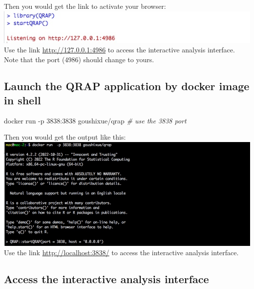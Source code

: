 \documentclass[
  a4paper,
  oneside]{book}
\newenvironment{Shaded}{\begin{snugshade}}{\end{snugshade}}
\newcommand{\CommentTok}[1]{\textcolor[rgb]{0.56,0.35,0.01}{\textit{#1}}}
\newcommand{\DecValTok}[1]{\textcolor[rgb]{0.00,0.00,0.81}{#1}}
\newcommand{\NormalTok}[1]{#1}
\newcommand{\SpecialCharTok}[1]{\textcolor[rgb]{0.00,0.00,0.00}{#1}}
\begin{document}
Then you would get the link to activate your browser:\\
\includegraphics{images/launch_R.jpeg}\\
Use the link \url{http://127.0.0.1:4986} to access the interactive analysis interface. Note that the port (4986) should change to yours.\\

\hypertarget{launch-the-qrap-application-by-docker-image-in-shell}{%
\subsection{Launch the QRAP application by docker image in shell}\label{launch-the-qrap-application-by-docker-image-in-shell}}

\begin{Shaded}
\begin{Highlighting}[]
\NormalTok{docker run  }\SpecialCharTok{{-}}\NormalTok{p }\DecValTok{3838}\SpecialCharTok{:}\DecValTok{3838}\NormalTok{ goushixue}\SpecialCharTok{/}\NormalTok{qrap }\CommentTok{\# use the 3838 port }
\end{Highlighting}
\end{Shaded}

Then you would get the output like this:\\
\includegraphics{images/launch_docker.jpeg}\\
Use the link \url{http://localhost:3838/} to access the interactive analysis interface.\\

\hypertarget{access-the-interactive-analysis-interface}{%
\subsection{Access the interactive analysis interface}\label{access-the-interactive-analysis-interface}}
\end{document}
